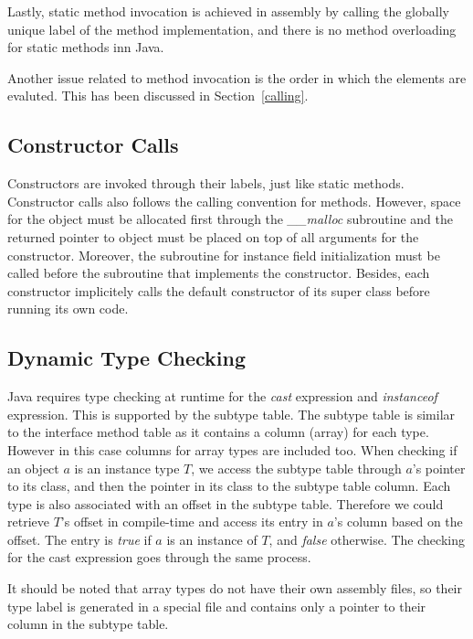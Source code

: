 \documentclass[a4paper, notitlepage]{report}
\begin{document}
Lastly, static method invocation is achieved in assembly by calling the globally unique label of the method implementation, and there is no method overloading for static methods inn Java.

Another issue related to method invocation is the order in which the elements are evaluted. This has been discussed in Section~\ref{calling}.

\subsection{Constructor Calls}

Constructors are invoked through their labels, just like static methods. Constructor calls also follows the calling convention for methods. However, space for the object must be allocated first through the \emph{\_\_malloc} subroutine and the returned pointer to object must be placed on top of all arguments for the constructor. Moreover, the subroutine for instance field initialization must be called before the subroutine that implements the constructor. Besides, each constructor implicitely calls the default constructor of its super class before running its own code. 

\subsection{Dynamic Type Checking}
\label{type_check}

Java requires type checking at runtime for the \emph{cast} expression and \emph{instanceof} expression. This is supported by the subtype table. The subtype table is similar to the interface method table as it contains a column (array) for each type. However in this case columns for array types are included too. When checking if an object $a$ is an instance type $T$, we access the subtype table through $a$'s pointer to its class, and then the pointer in its class to the subtype table column. Each type is also associated with an offset in the subtype table. Therefore we could retrieve $T$'s offset in compile-time and access its entry in $a$'s column based on the offset. The entry is \emph{true} if $a$ is an instance of $T$, and \emph{false} otherwise. The checking for the cast expression goes through the same process.

It should be noted that array types do not have their own assembly files, so their type label is generated in a special file and contains only a pointer to their column in the subtype table.
\end{document}
